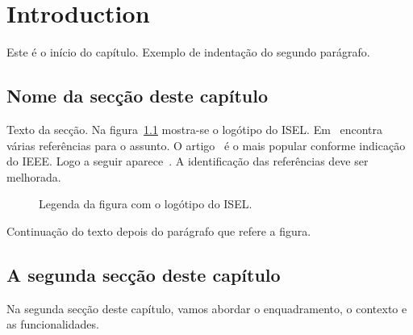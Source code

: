 %
%
\chapter{Introduction}\label{ch:introduction}

Este é o início do capítulo.
Exemplo de indentação do segundo parágrafo.

%
%


\section{Nome da secção deste capítulo} \label{sec11}

Texto da secção. Na figura~\ref{fig:logotipo} mostra-se o logótipo do ISEL. Em~\cite{wiki:bigdata2019} encontra várias referências para o assunto. O artigo~\cite{6547630} é o mais popular conforme indicação do IEEE. Logo a seguir aparece~\cite{6824752}. A identificação das referências deve ser melhorada.

\begin{figure}[h]
    \begin{center}
    \end{center}
    \caption{Legenda da figura com o logótipo do ISEL.}\label{fig:logotipo}
\end{figure}

Continuação do texto depois do parágrafo que refere a figura.

%
%


\section{A segunda secção deste capítulo} \label{sec12}
Na segunda secção deste capítulo, vamos abordar o enquadramento,
o contexto e as funcionalidades.

